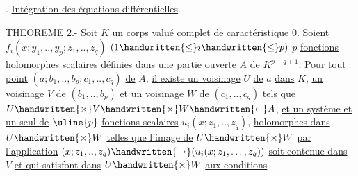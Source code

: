 . \uline{Intégration des équations différentielles}.

THEOREME 2.- \uline{Soit} $K$ \uline{un corps valué complet de caractéristique} $0$. \uline{Soient} $f_i(x;y_1,..,y_p;z_1,..,z_q)$ $(1\handwritten{\leq}i\handwritten{\leq}p)$ $p$ \uline{fonctions holomorphes scalaires définies dans une partie ouverte} $A$ \uline{de} $K^{p+q+1}$. \uline{Pour tout point} $(a;b_1,..,b_p;c_1,..,c_q)$ \uline{de} $A$, \uline{il existe un voisinage} $U$ \uline{de} $a$ \uline{dans} $K$, \uline{un voisinage} $V$ \uline{de} $(b_1,..,b_p)$ \uline{et un voisinage} $W$ \uline{de} $(c_1,..,c_q)$ \uline{tels que} $U\handwritten{\times}V\handwritten{\times}W\handwritten{\subset}A$, \uline{et un système et un seul de} $\uline{p}$ \uline{fonctions scalaires} $u_i(x;z_1,..,z_q)$, \uline{holomorphes dans} $U\handwritten{\times}W$\handwritten{,} \uline{telles que l'image de} $U\handwritten{\times}W$ \uline{par l'application} $(x;z_1,..,z_q)\handwritten{\to}(u_i(x;z_1,\ldots,z_q))$ \uline{soit contenue dans} $V$ \uline{et qui satisfont dans} $U\handwritten{\times}W$ \uline{aux conditions}
